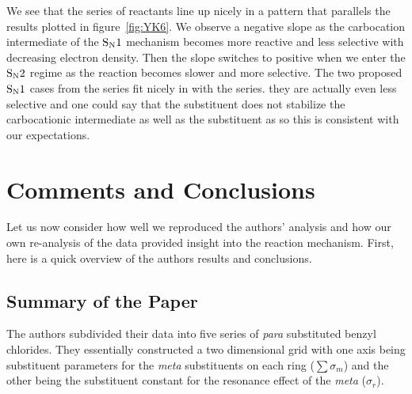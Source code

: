\documentclass{tufte-handout}
\begin{document}
We see that the series of reactants line up nicely in a pattern that parallels the results plotted in figure~\ref{fig:YK6}. We observe a negative slope as the carbocation intermediate of the $\rm S_N1$ mechanism becomes more reactive and less selective with decreasing electron density. Then the slope switches to positive when we enter the $\rm S_N2$ regime as the reaction becomes slower and more selective. The two proposed $\rm S_N1$ cases from the  series fit nicely in with the  series. they are actually even less selective and one could say that the  substituent does not stabilize the carbocationic intermediate as well as the  substituent as so this is consistent with our expectations.

\section{Comments and Conclusions}

Let us now consider how well we reproduced the authors' analysis and how our own re-analysis of the data provided insight into the reaction mechanism. First, here is a quick overview of the authors results and conclusions.

\subsection{Summary of the Paper}

The authors subdivided their data into five series of \textit{para} substituted benzyl chlorides. They essentially constructed a two dimensional grid with one axis being substituent parameters for the \textit{meta} substituents on each ring ($\sum \sigma_m$) and the other being the substituent constant for the resonance effect of the \textit{meta} ($\sigma_r$). 
\end{document}
